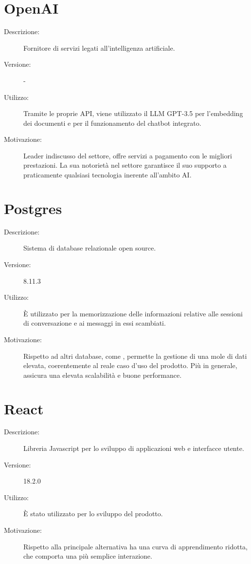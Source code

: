 \section{OpenAI}
\begin{description}
\item[Descrizione:] Fornitore di servizi legati all'intelligenza artificiale.
\item[Versione:] -
\item[Utilizzo:] Tramite le proprie API, viene utilizzato il LLM GPT-3.5 per l'embedding dei documenti e per il funzionamento del chatbot integrato.
\item[Motivazione:] Leader indiscusso del settore, offre servizi a pagamento con le migliori prestazioni. La sua notorietà nel settore garantisce il suo supporto a praticamente qualsiasi tecnologia inerente all'ambito AI.
\end{description}

\section{Postgres}
\begin{description}
\item[Descrizione:] Sistema di database relazionale open source.
\item[Versione:] 8.11.3
\item[Utilizzo:] È utilizzato per la memorizzazione delle informazioni relative alle sessioni di conversazione e ai messaggi in essi scambiati.
\item[Motivazione:] Rispetto ad altri database, come , permette la gestione di una mole di dati elevata, coerentemente al reale caso d'uso del prodotto. Più in generale, assicura una elevata scalabilità e buone performance.
\end{description}

\section{React}
\begin{description}
\item[Descrizione:] Libreria Javascript per lo sviluppo di applicazioni web e interfacce utente.
\item[Versione:] 18.2.0
\item[Utilizzo:] È stato utilizzato per lo sviluppo del prodotto.
\item[Motivazione:] Rispetto alla principale alternativa  ha una curva di apprendimento ridotta, che comporta una più semplice interazione.
\end{description}


